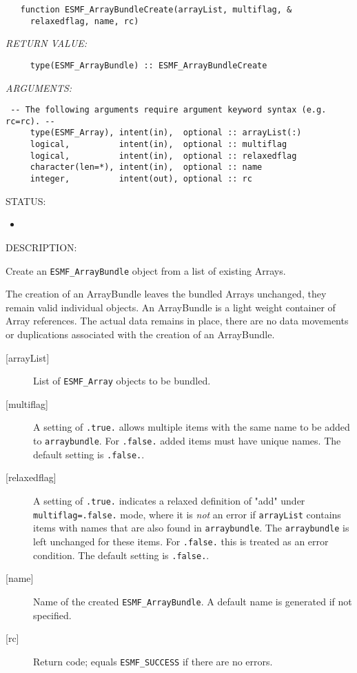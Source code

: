   
\begin{verbatim}   function ESMF_ArrayBundleCreate(arrayList, multiflag, &
     relaxedflag, name, rc)
           \end{verbatim}{\em RETURN VALUE:}
\begin{verbatim}     type(ESMF_ArrayBundle) :: ESMF_ArrayBundleCreate\end{verbatim}{\em ARGUMENTS:}
\begin{verbatim} -- The following arguments require argument keyword syntax (e.g. rc=rc). --
     type(ESMF_Array), intent(in),  optional :: arrayList(:)
     logical,          intent(in),  optional :: multiflag
     logical,          intent(in),  optional :: relaxedflag
     character(len=*), intent(in),  optional :: name
     integer,          intent(out), optional :: rc\end{verbatim}
{\sf STATUS:}
   \begin{itemize}
   \item{}
   \end{itemize}
  
{\sf DESCRIPTION:\\ }


     Create an {\tt ESMF\_ArrayBundle} object from a list of existing Arrays.
  
     The creation of an ArrayBundle leaves the bundled Arrays unchanged, they
     remain valid individual objects. An ArrayBundle is a light weight container
     of Array references. The actual data remains in place, there are no
     data movements or duplications associated with the creation of an 
     ArrayBundle.
  
     \begin{description}
     \item [{[arrayList]}]
       List of {\tt ESMF\_Array} objects to be bundled.
     \item [{[multiflag]}]
       A setting of {\tt .true.} allows multiple items with the same name
       to be added to {\tt arraybundle}. For {\tt .false.} added items must
       have unique names. The default setting is {\tt .false.}.
     \item [{[relaxedflag]}]
       A setting of {\tt .true.} indicates a relaxed definition of "add"
       under {\tt multiflag=.false.} mode, where it is {\em not} an error if 
       {\tt arrayList} contains items with names that are also found in 
       {\tt arraybundle}. The {\tt arraybundle} is left unchanged for these items.
       For {\tt .false.} this is treated as an error condition. 
       The default setting is {\tt .false.}.
     \item [{[name]}]
       Name of the created {\tt ESMF\_ArrayBundle}. A default name is generated
       if not specified.
     \item [{[rc]}]
       Return code; equals {\tt ESMF\_SUCCESS} if there are no errors.
     \end{description}
   
